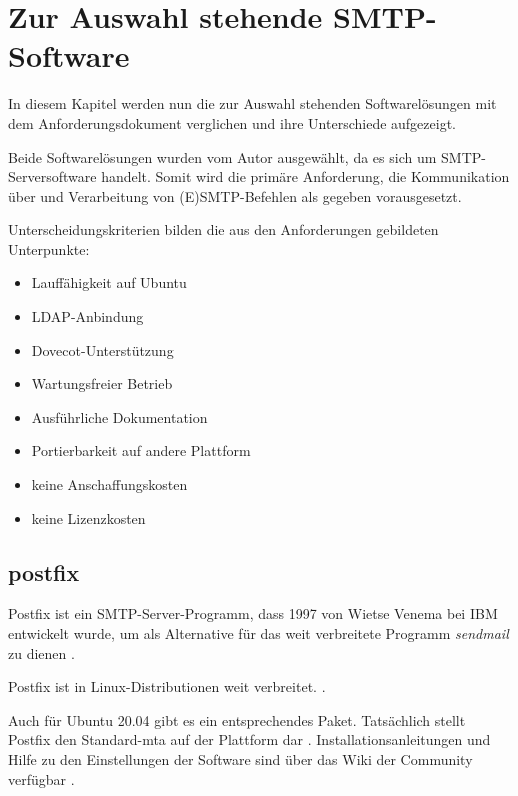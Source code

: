 \chapter{Zur Auswahl stehende SMTP-Software}
\label{sec:Auswahl}
In diesem Kapitel werden nun die zur Auswahl stehenden Softwarelösungen mit dem Anforderungsdokument verglichen und ihre Unterschiede aufgezeigt. 

Beide Softwarelösungen wurden vom Autor ausgewählt, da es sich um SMTP-Serversoftware handelt. Somit wird die primäre Anforderung, die Kommunikation über und Verarbeitung von (E)SMTP-Befehlen als gegeben vorausgesetzt.

Unterscheidungskriterien bilden die aus den Anforderungen gebildeten Unterpunkte:
\begin{itemize}
	\item Lauffähigkeit auf Ubuntu
	\item LDAP-Anbindung
	\item Dovecot-Unterstützung
	\item Wartungsfreier Betrieb
	\item Ausführliche Dokumentation
	\item Portierbarkeit auf andere Plattform
	\item keine Anschaffungskosten
	\item keine Lizenzkosten
\end{itemize}

\section{postfix}
Postfix ist ein SMTP-Server-Programm, dass 1997  von Wietse Venema bei IBM entwickelt wurde, um als Alternative für das weit verbreitete Programm \textit{sendmail} zu dienen \citep[vgl.][307]{Deimeke2019}.

Postfix ist in Linux-Distributionen weit verbreitet.  \citep[][53]{Heinlein2004}.

Auch für Ubuntu 20.04 gibt es ein entsprechendes Paket. Tatsächlich stellt Postfix den Standard-\ac{mta} auf der Plattform dar \citep[vgl.][]{ubuntupostfix}.
Installationsanleitungen und Hilfe zu den Einstellungen der Software sind über das Wiki der Community verfügbar \citep[vgl.][]{ubuntupostfixwiki}. 

